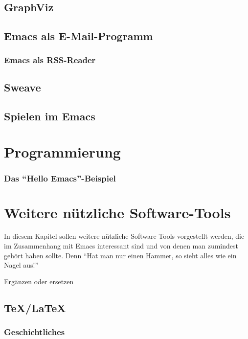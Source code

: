 \documentclass[12pt,ngerman]{scrbook}
\begin{document}
\section{GraphViz}

\section{Emacs als E-Mail-Programm}

\subsection{Emacs als RSS-Reader}



\section{Sweave}

\section{Spielen im Emacs}

\chapter{Programmierung}

\subsection{Das \enquote{Hello Emacs}-Beispiel}




\chapter{Weitere nützliche Software-Tools}

In diesem Kapitel sollen weitere nützliche Software-Tools vorgestellt werden, die im Zusammenhang mit Emacs interessant sind und von denen man zumindest gehört haben sollte. Denn \enquote{Hat man nur einen Hammer, so sieht alles wie ein Nagel aus!}	

Ergänzen oder ersetzen

\section{\TeX/\LaTeX}

\subsection{Geschichtliches}
\end{document}
